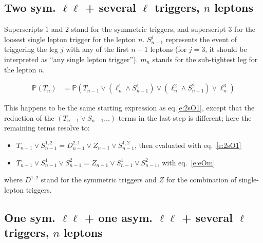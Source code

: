 \documentclass{article}
\newcommand{\pro}{\ensuremath{\mathbb{P}}}
\begin{document}
\subsection{Two sym. $\ell\ell$ + several $\ell$ triggers, $n$ leptons}

Superscripts $1$ and $2$ stand for the symmetric triggers, and superscript $3$ for the loosest single lepton trigger for the lepton $n$. $S_{n-1}^j$ represents the event of triggering the leg $j$ with any of the first $n-1$ leptons 
(for $j=3$, it should be interpreted as ``any single lepton trigger''). 
$m_n$ stands for the sub-tightest leg for the lepton $n$. 

\begin{align*}
\pro(T_n)&=
\pro(T_{n-1}\vee (\ell_n^1\wedge S_{n-1}^1) \vee (\ell_n^2\wedge S_{n-1}^2) \vee \ell_n^3)
\end{align*}

This happens to be the same starting expression as eq.\ref{e:2sO1}, except that the reduction of the $(T_{n-1}\vee S_{n-1}\ldots)$ 
terms in the last step is different; here the remaining terms resolve to:
\begin{itemize}
\item $T_{n-1}\vee S_{n-1}^{1,2} = D_{n-1}^{2,1}\vee Z_{n-1}\vee S_{n-1}^{1,2}$, then evaluated with eq.~\ref{e:2sO1}
\item $T_{n-1}\vee S_{n-1}^{1}\vee S_{n-1}^{2} = Z_{n-1} \vee S_{n-1}^{1}\vee S_{n-1}^2$, with eq.~\ref{e:eOm}
\end{itemize}
where $D^{1,2}$ stand for the symmetric triggers and $Z$ for the combination of single-lepton triggers. 

\subsection{One sym. $\ell\ell$ + one asym. $\ell\ell$ + several $\ell$ triggers, $n$ leptons}
\end{document}
